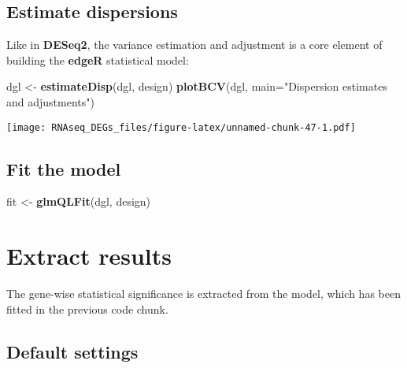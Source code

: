 \documentclass[]{book}
\newenvironment{Shaded}{\begin{snugshade}}{\end{snugshade}}
\newcommand{\KeywordTok}[1]{\textcolor[rgb]{0.13,0.29,0.53}{\textbf{#1}}}
\newcommand{\DataTypeTok}[1]{\textcolor[rgb]{0.13,0.29,0.53}{#1}}
\newcommand{\StringTok}[1]{\textcolor[rgb]{0.31,0.60,0.02}{#1}}
\newcommand{\OperatorTok}[1]{\textcolor[rgb]{0.81,0.36,0.00}{\textbf{#1}}}
\newcommand{\NormalTok}[1]{#1}
\begin{document}
\begin{Shaded}
\end{Shaded}

\subsection{Estimate dispersions}\label{estimate-dispersions}

Like in \textbf{DESeq2}, the variance estimation and adjustment is a
core element of building the \textbf{edgeR} statistical model:

\begin{Shaded}
\begin{Highlighting}[]
\NormalTok{dgl <-}\StringTok{ }\KeywordTok{estimateDisp}\NormalTok{(dgl, design)}
\KeywordTok{plotBCV}\NormalTok{(dgl, }\DataTypeTok{main=}\StringTok{"Dispersion estimates and adjustments"}\NormalTok{)}
\end{Highlighting}
\end{Shaded}

\texttt{[image: RNAseq\_DEGs\_files/figure-latex/unnamed-chunk-47-1.pdf]}

\subsection{Fit the model}\label{fit-the-model}

\begin{Shaded}
\begin{Highlighting}[]
\NormalTok{fit <-}\StringTok{ }\KeywordTok{glmQLFit}\NormalTok{(dgl, design)}
\end{Highlighting}
\end{Shaded}

\section{Extract results}\label{extract-results}

The gene-wise statistical significance is extracted from the model,
which has been fitted in the previous code chunk.

\subsection{Default settings}\label{default-settings}
\end{document}
